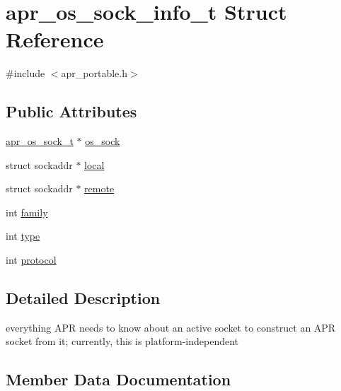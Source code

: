 \hypertarget{structapr__os__sock__info__t}{}\section{apr\+\_\+os\+\_\+sock\+\_\+info\+\_\+t Struct Reference}
\label{structapr__os__sock__info__t}


{\ttfamily \#include $<$apr\+\_\+portable.\+h$>$}

\subsection*{Public Attributes}
\begin{DoxyCompactItemize}
\item 
\mbox{\hyperlink{group__apr__portabile_ga2965cd2e48cb6513bc0ba05aa6083ed7}{apr\+\_\+os\+\_\+sock\+\_\+t}} $\ast$ \mbox{\hyperlink{structapr__os__sock__info__t_a952464d2f91ca4650e8b4848a81745b5}{os\+\_\+sock}}
\item 
struct sockaddr $\ast$ \mbox{\hyperlink{structapr__os__sock__info__t_afaf470560cbc3088479af708878aa086}{local}}
\item 
struct sockaddr $\ast$ \mbox{\hyperlink{structapr__os__sock__info__t_ae71fe14a5eb9141fc4ad0a6d0a91f17e}{remote}}
\item 
int \mbox{\hyperlink{structapr__os__sock__info__t_aa29fd0cf57b0b5e3559961f068fa8b7e}{family}}
\item 
int \mbox{\hyperlink{structapr__os__sock__info__t_a248fb394cd644b31619f44de0936aa04}{type}}
\item 
int \mbox{\hyperlink{structapr__os__sock__info__t_a176ede3ecf40abf0f82a01bfeb95f1e3}{protocol}}
\end{DoxyCompactItemize}


\subsection{Detailed Description}
everything A\+PR needs to know about an active socket to construct an A\+PR socket from it; currently, this is platform-\/independent 

\subsection{Member Data Documentation}
\mbox{\label{structapr__os__sock__info__t_aa29fd0cf57b0b5e3559961f068fa8b7e}} 
